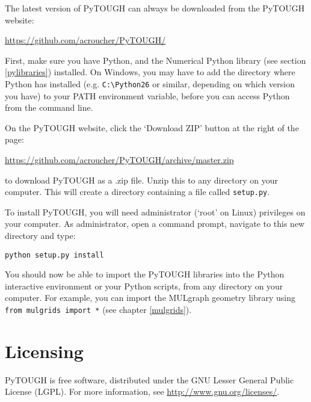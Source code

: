 The latest version of PyTOUGH can always be downloaded from the PyTOUGH website:

\url{https://github.com/acroucher/PyTOUGH/}

First, make sure you have Python, and the Numerical Python library (see section \ref{pylibraries}) installed.  On Windows, you may have to add the directory where Python has installed (e.g. \texttt{C:\textbackslash Python26} or similar, depending on which version you have) to your PATH environment variable, before you can access Python from the command line.

On the PyTOUGH website, click the `Download ZIP' button at the right of the page:

\url{https://github.com/acroucher/PyTOUGH/archive/master.zip}

to download PyTOUGH as a .zip file.  Unzip this to any directory on your computer.  This will create a directory containing a file called \texttt{setup.py}.

To install PyTOUGH, you will need administrator (`root' on Linux) privileges on your computer.  As administrator, open a command prompt, navigate to this new directory and type:

\begin{verbatim}
python setup.py install
\end{verbatim}

You should now be able to import the PyTOUGH libraries into the Python interactive environment or your Python scripts, from any directory on your computer.  For example, you can import the MULgraph geometry library using \texttt{from mulgrids import *} (see chapter \ref{mulgrids}).

\section{Licensing}

PyTOUGH is free software, distributed under the GNU Lesser General Public License (LGPL).  For more information, see \url{http://www.gnu.org/licenses/}.
